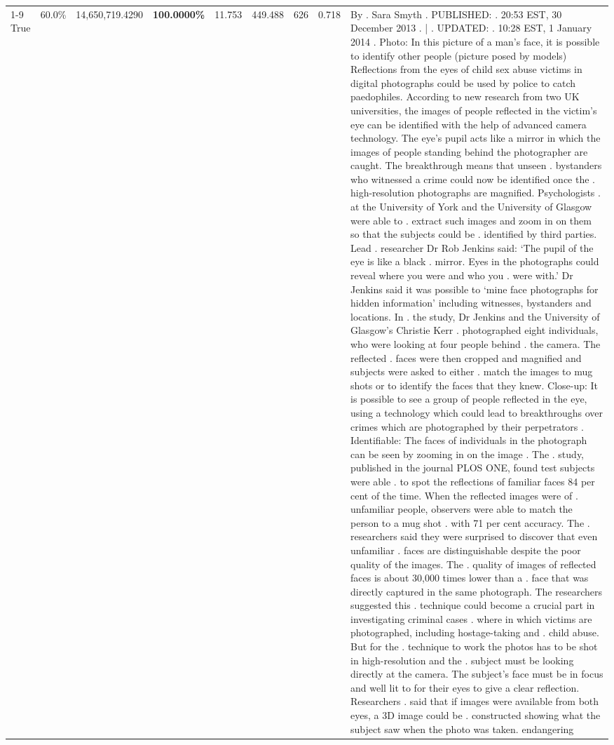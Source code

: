 \begin{table}[H]
\begin{tabular}{lllrlllll}
\cline{1-9}
True & 60.0\% & 14,650,719.4290 & \bfseries \color{red} 100.0000\% & 11.753 & 449.488 & 626 & 0.718 & By . Sara Smyth . PUBLISHED: . 20:53 EST, 30 December 2013 . | . UPDATED: . 10:28 EST, 1 January 2014 . Photo: In this picture of a man's face, it is possible to identify other people (picture posed by models) Reflections from the eyes of child sex abuse victims in digital photographs could be used by police to catch paedophiles. According to new research from two UK universities, the images of people reflected in the victim's eye can be identified with the help of advanced camera technology. The eye's pupil acts like a mirror in which the images of people standing behind the photographer are caught. The breakthrough means that unseen . bystanders who witnessed a crime could now be identified once the . high-resolution photographs are magnified. Psychologists . at the University of York and the University of Glasgow were able to . extract such images and zoom in on them so that the subjects could be . identified by third parties. Lead . researcher Dr Rob Jenkins said: ‘The pupil of the eye is like a black . mirror. Eyes in the photographs could reveal where you were and who you . were with.' Dr Jenkins said it was possible to ‘mine face photographs for hidden information' including witnesses, bystanders and locations. In . the study, Dr Jenkins and the University of Glasgow's Christie Kerr . photographed eight individuals, who were looking at four people behind . the camera. The reflected . faces were then cropped and magnified and subjects were asked to either . match the images to mug shots or to identify the faces that they knew. Close-up: It is possible to see a group of people reflected in the eye, using a technology which could lead to breakthroughs over crimes which are photographed by their perpetrators . Identifiable: The faces of individuals in the photograph can be seen by zooming in on the image . The . study, published in the journal PLOS ONE, found test subjects were able . to spot the reflections of familiar faces 84 per cent of the time. When the reflected images were of . unfamiliar people, observers were able to match the person to a mug shot . with 71 per cent accuracy. The . researchers said they were surprised to discover that even unfamiliar . faces are distinguishable despite the poor quality of the images. The . quality of images of reflected faces is about 30,000 times lower than a . face that was directly captured in the same photograph. The researchers suggested this . technique could become a crucial part in investigating criminal cases . where in which victims are photographed, including hostage-taking and . child abuse. But for the . technique to work the photos has to be shot in high-resolution and the . subject must be looking directly at the camera. The subject's face must be in focus and well lit to for their eyes to give a clear reflection. Researchers . said that if images were available from both eyes, a 3D image could be . constructed showing what the subject saw when the photo was taken. endangering \\

\end{tabular}
\end{table}
